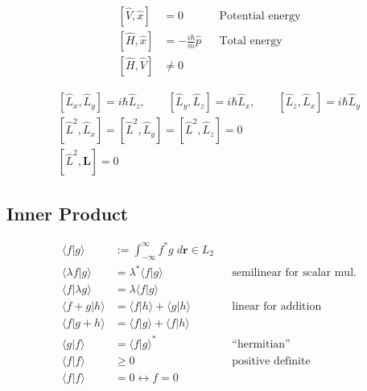 \noindent\begin{align*}
    \left[\widehat{V},\widehat{x}\right]  & =0                            &  & \text{Potential energy} \\
    \left[\widehat{H},\widehat{x}\right]  & =-\frac{i\hbar}{m}\widehat{p} &  & \text{Total energy}     \\
    \left[\widehat{H}, \widehat{V}\right] & \neq 0
\end{align*}

\label{comm_am_sp}
\noindent\begin{gather*}
    \left[\widehat{L}_{x},\widehat{L}_{y}\right] =i\hbar \widehat{L}_{z}, \qquad \left[\widehat{L}_{y},\widehat{L}_{z}\right]  =i\hbar \widehat{L}_{x}, \qquad \left[\widehat{L}_{z},\widehat{L}_{x}\right]  =i\hbar \widehat{L}_{y}      \\
    \left[\widehat{L}^{2},\widehat{L}_{x}\right] = \left[\widehat{L}^{2},\widehat{L}_{y}\right] = \left[\widehat{L}^{2},\widehat{L}_{z}\right] = 0\\
    \left[\widehat{L}^2, \mathbf{L}\right]=0
\end{gather*}

\subsection{Inner Product}\label{ssec:InnerProd}
\noindent\begin{align*}
    \langle f|g \rangle         & := \int_{-\infty}^{\infty} f^* g\; d \mathbf{r} \in L_2 &  &                                   \\
    \langle \lambda f|g \rangle & =\lambda^* \langle f|g \rangle                          &  & \text{semilinear for scalar mul.} \\
    \langle f|\lambda g \rangle & =\lambda \langle f|g \rangle                                                                   \\
    \langle f+g|h \rangle       & =\langle f|h \rangle + \langle g|h \rangle              &  & \text{linear for addition}        \\
    \langle f|g+h \rangle       & =\langle f|g \rangle + \langle f|h \rangle                                                     \\
    \langle g|f \rangle         & = {\langle f|g \rangle}^*                               &  & \text{``hermitian''}              \\
    \langle f|f \rangle         & \ge 0                                                   &  & \text{positive definite}          \\
    \langle f|f \rangle         & = 0 \leftrightarrow f=0
\end{align*}

